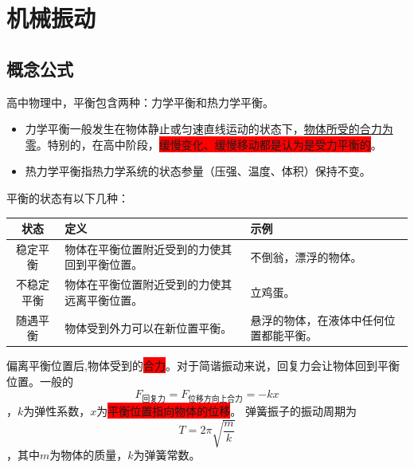 \documentclass{lesson}
\begin{document}
\section{机械振动}
\subsection{概念公式}
高中物理中，平衡包含两种：力学平衡和热力学平衡。
\begin{itemize}
\item 力学平衡一般发生在物体静止或匀速直线运动的状态下，\underline{物体所受的合力为零}。特别的，在高中阶段，\colorbox{red}{缓慢变化、缓慢移动都是认为是受力平衡的}。
\item 热力学平衡指热力学系统的状态参量（压强、温度、体积）保持不变。
\end{itemize}
平衡的状态有以下几种：
\begin{table}[h!]
	\centering
	\begin{tabular}{|c|p{5cm}|p{5cm}|}
		\hline
		\textbf{状态} & \textbf{定义}            & \textbf{示例}         \\
		\hline
		稳定平衡        & 物体在平衡位置附近受到的力使其回到平衡位置。 & 不倒翁，漂浮的物体。          \\
		\hline
		不稳定平衡       & 物体在平衡位置附近受到的力使其远离平衡位置。 & 立鸡蛋。                \\
		\hline
		随遇平衡        & 物体受到外力可以在新位置平衡。        & 悬浮的物体，在液体中任何位置都能平衡。 \\
		\hline
	\end{tabular}
\end{table}
偏离平衡位置后,物体受到的\colorbox{red}{合力}。对于简谐振动来说，回复力会让物体回到平衡位置。一般的\[F_\text{回复力}=F_{\text{位移方向上合力}}=-kx\]，$k$为弹性系数，$x$为\colorbox{red}{平衡位置指向物体的位移}。
弹簧振子的振动周期为\[T = 2\pi\sqrt{\frac{m}{k}}\]，其中$m$为物体的质量，$k$为弹簧常数。
\end{document}
